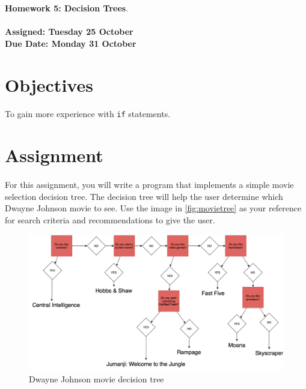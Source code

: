 \documentclass[letter,11pt]{article}
\begin{document}
\huge
\textbf{Homework 5: Decision Trees}.
\normalsize
\\ ~~ \\
\textbf{Assigned: Tuesday 25 October} \\
\textbf{Due Date: Monday 31 October}

\section*{Objectives}
\paragraph{}To gain more experience with \texttt{if} statements.

\FloatBarrier
\section*{Assignment}
\paragraph{}For this assignment, you will write a program that implements a simple movie selection decision tree. The decision tree will help the user determine which Dwayne Johnson movie to see. Use the image in \autoref{fig:movietree} as your reference for search criteria and recommendations to give the user.

\begin{figure}[h!]
    \centering
    \includegraphics[scale=0.41]{Homework/Homework 05 - Dwayne Johnson Movie Decision Tree.png}
    \caption{Dwayne Johnson movie decision tree}
    \label{fig:movietree}
\end{figure}
\end{document}
